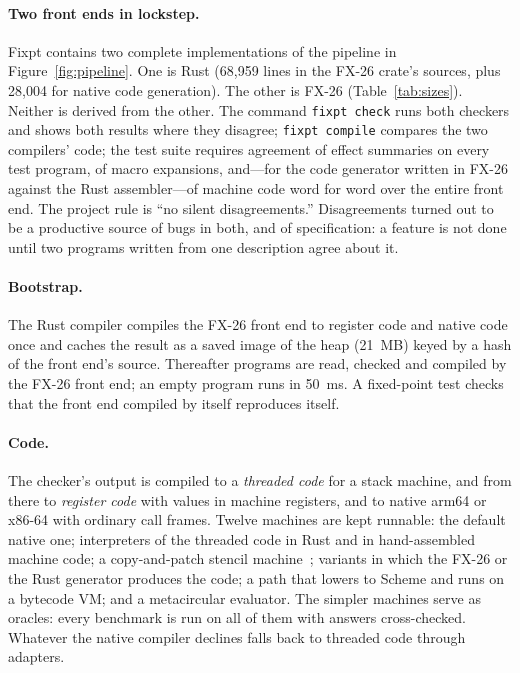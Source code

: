 \documentclass[acmsmall,screen,review]{acmart}
\newcommand{\cd}[1]{\texttt{#1}}
\newcommand{\fx}{FX-26}
\begin{document}
\paragraph{Two front ends in lockstep.} Fixpt contains two complete
implementations of the pipeline in Figure~\ref{fig:pipeline}. One is
Rust (68,959 lines in the \fx{} crate's sources, plus 28,004 for native
code generation). The other is \fx{} (Table~\ref{tab:sizes}). Neither is
derived from the other. The command \cd{fixpt check} runs both checkers
and shows both results where they disagree; \cd{fixpt compile} compares
the two compilers' code; the test suite requires agreement of effect
summaries on every test program, of macro expansions, and---for the
code generator written in \fx{} against the Rust assembler---of machine
code word for word over the entire front end. The project rule is ``no
silent disagreements.'' Disagreements turned out to be a productive
source of bugs in both, and of specification: a feature is not done
until two programs written from one description agree about it.

\paragraph{Bootstrap.} The Rust compiler compiles the \fx{} front end
to register code and native code once and caches the result as a saved image of the heap (21~MB) keyed by a hash of the front end's source. Thereafter
programs are read, checked and compiled by the \fx{} front end; an
empty program runs in 50~ms. A fixed-point test checks that the
front end compiled by itself reproduces itself.

\paragraph{Code.} The checker's output is compiled to a \emph{threaded code} for a stack machine, and from there to \emph{register code}
with values in machine registers, and to native arm64 or x86-64 with
ordinary call frames. Twelve machines are kept runnable: the default
native one; interpreters of the threaded code in Rust and in
hand-assembled machine code; a copy-and-patch stencil
machine~\cite{copy-and-patch}; variants in which the \fx{} or the Rust
generator produces the code; a path that lowers to Scheme and runs on a
bytecode VM; and a metacircular evaluator. The simpler machines serve
as oracles: every benchmark is run on all of them with answers
cross-checked. Whatever the native compiler declines falls back to
threaded code through adapters.
\end{document}
